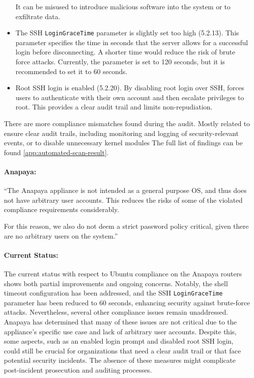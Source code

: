 \begin{itemize}
    It can be misused to introduce malicious software into the system or to exfiltrate data.
    \item The SSH \texttt{LoginGraceTime} parameter is slightly set too high (5.2.13).
    This parameter specifies the time in seconds that the server allows for a successful login before disconnecting.
    A shorter time would reduce the risk of brute force attacks.
    Currently, the parameter is set to 120 seconds, but it is recommended to set it to 60 seconds.
    \item Root SSH login is enabled (5.2.20).
    By disabling root login over SSH, forces users to authenticate with their own account and then escalate privileges to root.
    This provides a clear audit trail and limits non-repudiation.
\end{itemize}


There are more compliance mismatches found during the audit.
Mostly related to ensure clear audit trails, including monitoring and logging of security-relevant events, or to disable unnecessary kernel modules
The full list of findings can be found \cref{app:automated-scan-result}.


\begin{boxH}
\paragraph{Anapaya:}
``The Anapaya appliance is not intended as a general purpose OS, and thus does not have arbitrary user accounts. This reduces the risks of some of the violated compliance requirements considerably.

For this reason, we also do not deem a strict password policy critical, given there are no arbitrary users on the system.''
\end{boxH}


\paragraph{Current Status:}
The current status with respect to Ubuntu compliance on the Anapaya routers shows both partial improvements and ongoing concerns.
Notably, the shell timeout configuration has been addressed, and the SSH \texttt{LoginGraceTime} parameter has been reduced to 60 seconds, enhancing security against brute-force attacks.
Nevertheless, several other compliance issues remain unaddressed.
Anapaya has determined that many of these issues are not critical due to the appliance's specific use case and lack of arbitrary user accounts.
Despite this, some aspects, such as an enabled login prompt and disabled root SSH login, could still be crucial for organizations that need a clear audit trail or that face potential security incidents.
The absence of these measures might complicate post-incident prosecution and auditing processes.

